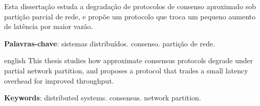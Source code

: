 \documentclass[12pt,twoside,a4paper,chapter=TITLE]{abntex2}
\begin{document}
\imprimircapa
\imprimirfolhaderosto*

\begin{resumo}
Esta disserta\c{c}\~ao estuda a degrada\c{c}\~ao de protocolos de consenso
aproximado sob parti\c{c}\~ao parcial de rede, e prop\~oe um protocolo que
troca um pequeno aumento de lat\^encia por maior vaz\~ao.

 \vspace{\onelineskip}

 \noindent
 \textbf{Palavras-chave}: sistemas distribu\'idos. consenso. parti\c{c}\~ao de rede.
\end{resumo}

\begin{resumo}
 \begin{otherlanguage*}{english}
This thesis studies how approximate consensus protocols degrade under
partial network partition, and proposes a protocol that trades a small
latency overhead for improved throughput.

 \vspace{\onelineskip}

 \noindent
 \textbf{Keywords}: distributed systems. consensus. network partition.
 \end{otherlanguage*}
\end{resumo}

\pretextual

\tableofcontents

\textual




\postextual


\end{document}
